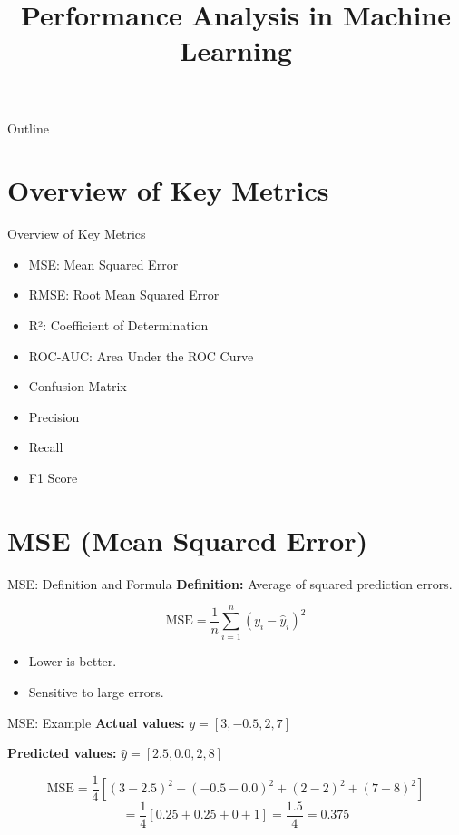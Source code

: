 \documentclass{beamer}
\title{Performance Analysis in Machine Learning}
\subtitle{}
\date{}
\begin{document}
{
\begin{frame}
    \titlepage
\end{frame}
}

\begin{frame}{Outline}
    \tableofcontents
\end{frame}


\section{Overview of Key Metrics}
\begin{frame}{Overview of Key Metrics}
\begin{itemize}
  \item MSE: Mean Squared Error
  \item RMSE: Root Mean Squared Error
  \item R²: Coefficient of Determination
  \item ROC-AUC: Area Under the ROC Curve
  \item Confusion Matrix
  \item Precision
  \item Recall
  \item F1 Score
\end{itemize}
\end{frame}

\section{MSE (Mean Squared Error)}

\begin{frame}{MSE: Definition and Formula}
\textbf{Definition:} Average of squared prediction errors.

\[
\text{MSE} = \frac{1}{n} \sum_{i=1}^{n} (y_i - \hat{y}_i)^2
\]

\begin{itemize}
  \item Lower is better.
  \item Sensitive to large errors.
\end{itemize}
\end{frame}

\begin{frame}{MSE: Example}
\textbf{Actual values:} \( y = [3, -0.5, 2, 7] \)

\textbf{Predicted values:} \( \hat{y} = [2.5, 0.0, 2, 8] \)

\vspace{0.3cm}
\[
\text{MSE} = \frac{1}{4}[(3 - 2.5)^2 + (-0.5 - 0.0)^2 + (2 - 2)^2 + (7 - 8)^2]
\]
\[
= \frac{1}{4}[0.25 + 0.25 + 0 + 1] = \frac{1.5}{4} = 0.375
\]
\end{frame}
\end{document}
